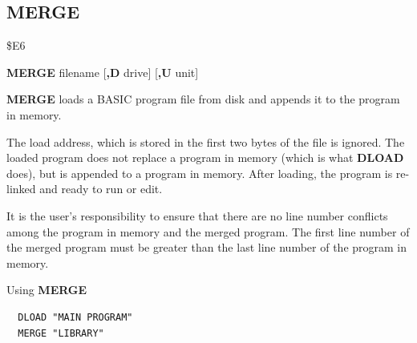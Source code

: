 
\newpage
\subsection{MERGE}
\begin{description}[leftmargin=2cm,style=nextline]
\item [Token:] \$E6
\item [Format:] {\bf MERGE} filename [{\bf,D} drive] [{\bf,U} unit]
\item [Usage:] {\bf MERGE} loads a BASIC program file from disk
               and appends it to the program in memory.

   \filenamedefinition

   \drivedefinition

   \unitdefinition

\item [Remarks:]
   The load address, which is stored in the first two bytes
   of the file is ignored. The loaded program does not
   replace a program in memory (which is what {\bf DLOAD} does),
   but is appended to a program in memory.
   After loading, the program is re-linked
   and ready to run or edit.

   It is the user's responsibility to ensure that there
   are no line number conflicts among the program in memory and
   the merged program. The first line number of the merged
   program must be greater than the last line number of the
   program in memory.

\item [Example:] Using {\bf MERGE}
\begin{tcolorbox}[colback=black,coltext=white]
\verbatimfont{\codefont}
\begin{verbatim}
  DLOAD "MAIN PROGRAM"
  MERGE "LIBRARY"
\end{verbatim}
\end{tcolorbox}
\end{description}


\newpage
